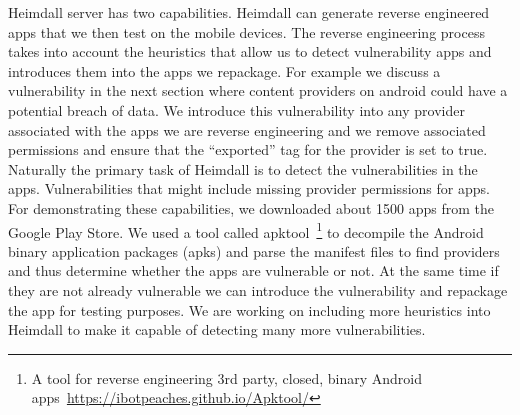 Heimdall server has two capabilities. Heimdall can generate reverse engineered apps that we then test on the mobile devices. The reverse engineering process takes into account the heuristics that allow us to detect vulnerability apps and introduces them into the apps we repackage. For example we discuss a vulnerability in the next section where content providers on android could have a potential breach of data. We introduce this vulnerability into any provider associated with the apps we are reverse engineering and we remove associated permissions and ensure that the ``exported'' tag for the provider is set to true. Naturally the primary task of Heimdall is to detect the vulnerabilities in the apps. Vulnerabilities that might include missing provider permissions for apps. For demonstrating these capabilities, we downloaded about 1500 apps from the Google Play Store. We used a tool called apktool~\footnote{A tool for reverse engineering 3rd party, closed, binary Android apps~\url{https://ibotpeaches.github.io/Apktool/}} to decompile the Android binary application packages (apks) and parse the manifest files to find providers and thus determine whether the apps are vulnerable or not. At the same time if they are not already vulnerable we can introduce the vulnerability and repackage the app for testing purposes. We are working on including more heuristics into Heimdall to make it capable of detecting many more vulnerabilities.